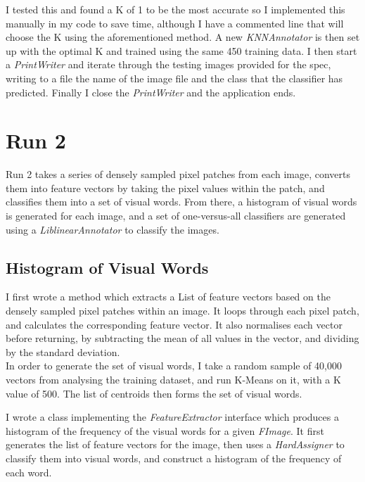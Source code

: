 \documentclass{article}
\begin{document}
	I tested this and found a K of 1 to be the most accurate so I implemented this manually in my code to save time, although I have a commented line that will choose the K using the aforementioned method.
	A new \textit{KNNAnnotator} is then set up with the optimal K and trained using the same 450 training data. I then start a \textit{PrintWriter} and iterate through the testing images provided for the spec, writing to a file the name of the image file and the class that the classifier has predicted.
	Finally I close the \textit{PrintWriter} and the application ends.
	\section{Run 2}
	
	Run 2 takes a series of densely sampled pixel patches from each image, converts them into feature vectors by taking the pixel values within the patch, and classifies them into a set of visual words. From there, a histogram of visual words is generated for each image, and a set of one-versus-all classifiers are generated using a \textit{LiblinearAnnotator} to classify the images. 
	
	\subsection{ Histogram of Visual Words }
	
	I first wrote a method which extracts a List of feature vectors based on the densely sampled pixel patches within an image. It loops through each pixel patch, and calculates the corresponding feature vector. It also normalises each vector before returning, by subtracting the mean of all values in the vector, and dividing by the standard deviation.\\
	In order to generate the set of visual words, I take a random sample of 40,000 vectors from analysing the training dataset, and run K-Means on it, with a K value of 500. The list of centroids then forms the set of visual words.\\
	\newline
	
	I wrote a class implementing the \textit{FeatureExtractor} interface which produces a histogram of the frequency of the visual words for a given \textit{FImage}. It first generates the list of feature vectors for the image, then uses a \textit{HardAssigner} to classify them into visual words, and construct a histogram of the frequency of each word.
	
\end{document}
